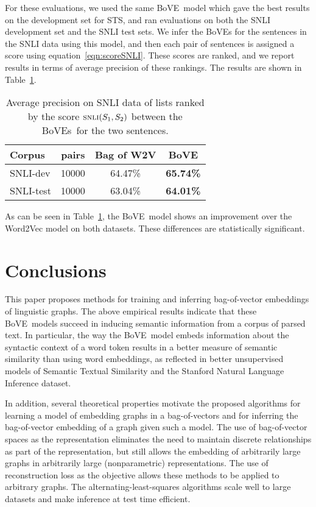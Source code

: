 \documentclass[11pt,a4paper]{article}
\DeclareMathOperator*{\SNLI}{\mbox{\sc snli}}
\newcommand{\bove}{Bo{\nolinebreak\hspace{-0.25ex}}VE}
\newcommand{\boves}{Bo{\nolinebreak\hspace{-0.25ex}}VEs}
\begin{document}
For these evaluations, we used the same \bove\ model which gave the best
results on the development set for STS, and ran evaluations on both
the SNLI development set and the SNLI test sets.  We infer the {\boves} for
the sentences in the SNLI data using this model, and then each pair of
sentences is assigned a score using equation~\ref{eqn:scoreSNLI}.  These
scores are ranked, and we report results in terms of average precision of
these rankings.  The results are shown in Table~\ref{tab:results-SNLI}.


\begin{table}[htb]
\begin{tabular}{|l||c|c|c|}
\hline
Corpus  & pairs & Bag of W2V & \bove \\
\hline\hline
SNLI-dev & {10000} & {64.47\%} & {\bf 65.74\%}\\
\hline
SNLI-test & {10000} & {63.04\%} & {\bf 64.01\%}\\
\hline
\end{tabular}
\caption{
Average precision on SNLI data of lists ranked by the score $\SNLI(S_1,S_2)$
between the \boves\ for the two sentences. 
}
\label{tab:results-SNLI}
\end{table}

As can be seen in Table~\ref{tab:results-SNLI}, the \bove\ model shows an
improvement over the Word2Vec model on both datasets.  These differences are
statistically significant.



\section{Conclusions}

This paper proposes methods for training and inferring bag-of-vector
embeddings of linguistic graphs.
The above empirical results indicate that these \bove\ models succeed in
inducing semantic information from a corpus of parsed text.  In particular,
the way the \bove\ model embeds information about the syntactic
context of a word token results in a better measure of semantic similarity
than using word embeddings, as reflected in better unsupervised models of
Semantic Textual Similarity and the Stanford Natural Language Inference
dataset.

In addition, several theoretical properties motivate the proposed algorithms
for learning a model of embedding graphs in a bag-of-vectors and for inferring
the bag-of-vector embedding of a graph given such a model.  The use of
bag-of-vector spaces as the representation eliminates the need to maintain
discrete relationships as part of the representation, but still allows the
embedding of arbitrarily large graphs in arbitrarily large (nonparametric)
representations.  The use of reconstruction loss as the objective allows these
methods to be applied to arbitrary graphs.  The alternating-least-squares
algorithms scale well to large datasets and make inference at test time
efficient.
\end{document}
